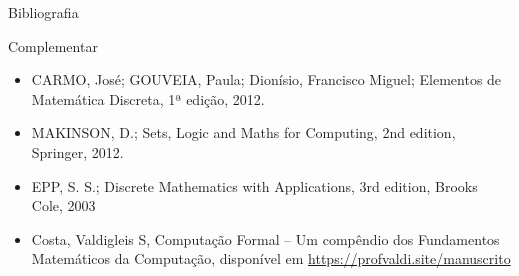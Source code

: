 \documentclass{beamer}
\begin{document}
	\begin{frame}{Bibliografia}
		\begin{block}{Complementar}
			\begin{itemize}
				\item CARMO, José; GOUVEIA, Paula; Dionísio, Francisco Miguel; Elementos de Matemática Discreta, 1ª edição, 2012.
				\item MAKINSON, D.; Sets, Logic and Maths for Computing, 2nd edition, Springer, 2012.
				\item EPP, S. S.; Discrete Mathematics with Applications, 3rd edition, Brooks Cole, 2003
				\item {\color{red}Costa, Valdigleis S, Computação Formal -- Um compêndio dos Fundamentos Matemáticos da Computação}, disponível em \url{https://profvaldi.site/manuscrito}
			\end{itemize}
		\end{block}
	\end{frame}
\end{document}
